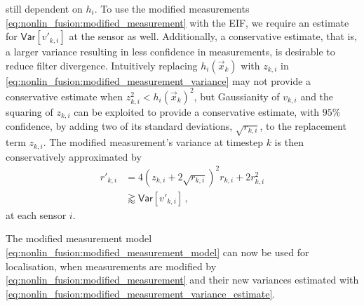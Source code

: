 still dependent on $h_i$. To use the modified measurements \eqref{eq:nonlin_fusion:modified_measurement} with the EIF, we require an estimate for $\mathsf{Var}[v'_{k, i}]$ at the sensor as well. Additionally, a conservative estimate, that is, a larger variance resulting in less confidence in measurements, is desirable to reduce filter divergence. Intuitively replacing $h_i(\vec{x}_k)$ with $z_{k, i}$ in \eqref{eq:nonlin_fusion:modified_measurement_variance} may not provide a conservative estimate when $z_{k, i}^2 < h_i(\vec{x}_k)^2$, but Gaussianity of $v_{k, i}$ and the squaring of $z_{k, i}$ can be exploited to provide a conservative estimate, with $95\%$ confidence, by adding two of its standard deviations, $\sqrt{r_{k, i}}$, to the replacement term $z_{k, i}$. The modified measurement's variance at timestep $k$ is then conservatively approximated by
\begin{equation}\label{eq:nonlin_fusion:modified_measurement_variance_estimate}
    \begin{split}
        r'_{k, i} &= 4(z_{k,i} + 2\sqrt{r_{k,i}})^2r_{k,i} + 2r_{k,i}^2 \\
        &\gtrapprox \mathsf{Var}[v'_{k,i}]\,,
    \end{split}
\end{equation}
at each sensor $i$.

The modified measurement model \eqref{eq:nonlin_fusion:modified_measurement_model} can now be used for localisation, when measurements are modified by \eqref{eq:nonlin_fusion:modified_measurement} and their new variances estimated with \eqref{eq:nonlin_fusion:modified_measurement_variance_estimate}.

% 
% 

